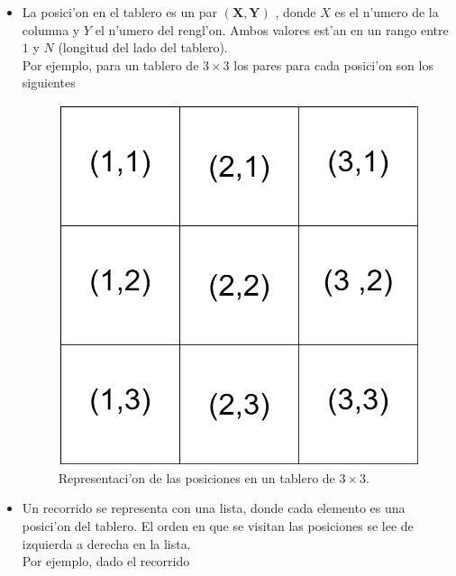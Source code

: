 \documentclass[12pt]{article}
\begin{document}
    \begin{itemize}
        \item La posici'on en el tablero es un par  $\mathbf{(X,Y)}$ , donde
        $X$ es el n'umero de la columna y $Y$ el n'umero del rengl'on.
        Ambos valores est'an en un rango entre $1$ y $N$ (longitud
        del lado del tablero). \\
        Por ejemplo, para un tablero de $3\times 3$ los
        pares para cada posici'on son los siguientes

        \begin{figure}[H]
            \centering
            \includegraphics[scale=0.22]{tablero_posiciones.png}
            \caption{Representaci'on de las posiciones en un tablero de $3\times 3$.}
            \label{fig: posiciones}
        \end{figure}



        \item Un recorrido se representa con una lista, donde cada elemento
        es una posici'on del tablero. El orden en que se visitan las
        posiciones se lee de izquierda a derecha en la lista.\\
        Por ejemplo, dado el recorrido


\end{itemize}
\end{document}
